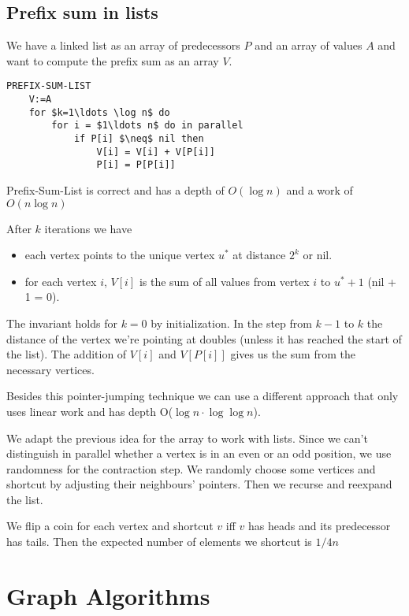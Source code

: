 \subsection{Prefix sum in lists}
We have a linked list as an array of predecessors $P$ and an array of values $A$ and want to compute the prefix sum as an array $V$.

\begin{lstlisting}
PREFIX-SUM-LIST
	V:=A
	for $k=1\ldots \log n$ do
		for i = $1\ldots n$ do in parallel
			if P[i] $\neq$ nil then
				V[i] = V[i] + V[P[i]]
				P[i] = P[P[i]]
\end{lstlisting}

\begin{thm} Prefix-Sum-List is correct and has a depth of $O(\log n)$ and a work of $O(n\log n)$\end{thm}

\begin{pr}After $k$ iterations we have
\begin{itemize}
\item each vertex points to the unique vertex $u^*$ at distance $2^k$ or nil.
\item for each vertex $i$, $V[i]$ is the sum of all values from vertex $i$ to $u^*+1$ (nil + 1 = 0). 
\end{itemize}

The invariant holds for $k=0$ by initialization. In the step from $k-1$ to $k$ the distance of the vertex we're pointing at doubles (unless it has reached the start of the list). The addition of $V[i]$ and $V[P[i]]$ gives us the sum from the necessary vertices.
\end{pr}

Besides this pointer-jumping technique we can use a different approach that only uses linear work and has depth O($\log n \cdot \log \log n$).

We adapt the previous idea for the array to work with lists. Since we can't distinguish in parallel whether a vertex is in an even or an odd position, we use randomness for the contraction step. We randomly choose some vertices and shortcut by adjusting their neighbours' pointers. Then we recurse and reexpand the list.

We flip a coin for each vertex and shortcut $v$ iff $v$ has heads and its predecessor has tails. Then the expected number of elements we shortcut is $1/4n$

\section{Graph Algorithms}

